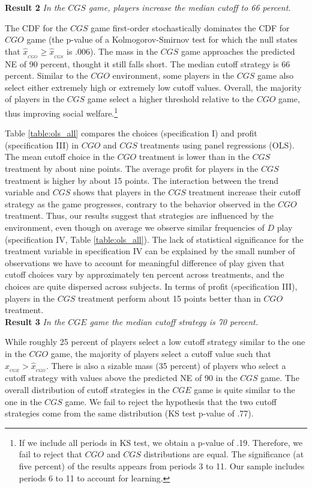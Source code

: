 \documentclass[11pt, letterpaper]{article}
\theoremstyle{plain}
\begin{document}
\noindent \textbf{Result 2}
\textit{In the $CGS$ game, players increase the median cutoff to 66 percent.}

The CDF for the $CGS$ game first-order stochastically dominates the CDF for $CGO$ game (the p-value of a Kolmogorov-Smirnov test for which the null states that $\hat{x}_{_{CGO}} \geq \hat{x}_{_{CGS}}$ is .006). The mass in the $CGS$ game approaches the predicted NE of 90 percent, thought it still falls short. The median cutoff strategy is 66 percent. Similar to the $CGO$ environment, some players in the $CGS$ game also select either extremely high or extremely low cutoff values. Overall, the majority of players in the $CGS$ game select a higher threshold relative to the $CGO$ game, thus improving social welfare.\footnote{If we include all periods in KS test, we obtain a p-value of .19. Therefore, we fail to reject that $CGO$ and $CGS$ distributions are equal. The significance (at five percent) of the results appears from periods 3 to 11. Our sample includes periods 6 to 11 to account for learning.}

Table \ref{table:ols_all} compares the choices (specification I) and profit (specification III) in $CGO$ and $CGS$ treatments using panel regressions (OLS). The mean cutoff choice in the $CGO$ treatment is lower than in the $CGS$ treatment by about nine points. The average profit for players in the $CGS$ treatment is higher by about 15 points. The interaction between the trend variable and $CGS$ shows that players in the $CGS$ treatment increase their cutoff strategy as the game progresses, contrary to the behavior observed in the $CGO$ treatment. Thus, our results suggest that strategies are influenced by the environment, even though on average we observe similar frequencies of $D$ play (specification IV, Table \ref{table:ols_all}). The lack of statistical significance for the treatment variable in specification IV can be explained by the small number of observations we have to account for meaningful difference of play given that cutoff choices vary by approximately ten percent across treatments, and the choices are quite dispersed across subjects. In terms of profit (specification III), players in the $CGS$ treatment perform about 15 points better than in $CGO$ treatment. \\ 


\noindent \textbf{Result 3}
\textit{In the $CGE$ game the median cutoff strategy is 70 percent.}

While roughly 25 percent of players select a low cutoff strategy similar to the one in the $CGO$ game, the majority of players select a cutoff value such that $\hat{x}_{_{CGE}}> \hat{x}_{_{CGO}}$. There is also a sizable mass (35 percent) of players who select a cutoff strategy with values above the predicted NE of 90 in the $CGS$ game. The overall distribution of cutoff strategies in the $CGE$ game is quite similar to the one in the $CGS$ game. We fail to reject the hypothesis that the two cutoff strategies come from the same distribution (KS test p-value of .77).
\end{document}
